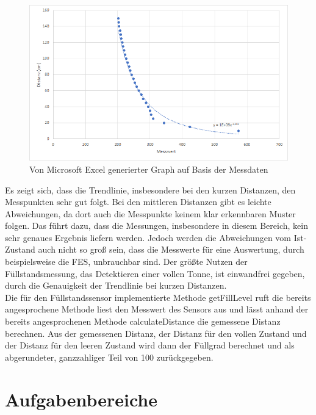         \begin{figure}[H]
            \begin{center}
                \includegraphics[width=12cm]{media/03_technical_implementation/calibration.png}                
            \end{center}
            \caption{Von Microsoft Excel generierter Graph auf Basis der Messdaten}
            \label{fig:calibration}
        \end{figure}

        Es zeigt sich, dass die Trendlinie, insbesondere bei den kurzen Distanzen, den Messpunkten sehr gut folgt. Bei den mittleren Distanzen gibt es leichte Abweichungen, da dort auch die Messpunkte keinem klar erkennbaren Muster folgen. Das führt dazu, dass die Messungen, insbesondere in diesem Bereich, kein sehr genaues Ergebnis liefern werden. Jedoch werden die Abweichungen vom Ist-Zustand auch nicht so groß sein, dass die Messwerte für eine Auswertung, durch beispielsweise die FES, unbrauchbar sind. Der größte Nutzen der Füllstandsmessung, das Detektieren einer vollen Tonne, ist einwandfrei gegeben, durch die Genauigkeit der Trendlinie bei kurzen Distanzen.\\

        Die für den Füllstandssensor implementierte Methode getFillLevel ruft die bereits angesprochene Methode liest den Messwert des Sensors aus und lässt anhand der bereits angesprochenen Methode calculateDistance die gemessene Distanz berechnen. Aus der gemessenen Distanz, der Distanz für den vollen Zustand und der Distanz für den leeren Zustand wird dann der Füllgrad berechnet und als abgerundeter, ganzzahliger Teil von 100 zurückgegeben.

    \section{Aufgabenbereiche}

